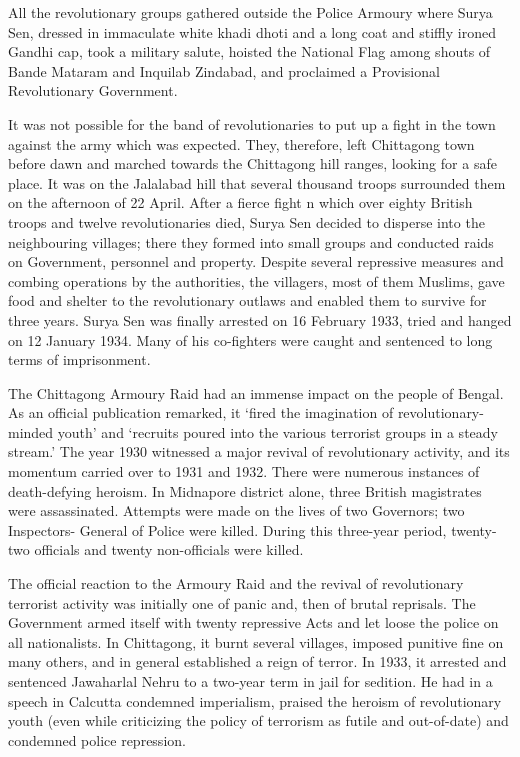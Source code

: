 All the revolutionary groups gathered outside the Police Armoury where Surya Sen, dressed in immaculate white khadi dhoti and a long coat and stiffly ironed Gandhi cap, took a military salute, hoisted the National Flag among shouts of Bande Mataram and Inquilab Zindabad, and proclaimed a Provisional Revolutionary Government.

It was not possible for the band of revolutionaries to put up a fight in the town against the army which was expected. They, therefore, left Chittagong town before dawn and marched towards the Chittagong hill ranges, looking for a safe place. It was on the Jalalabad hill that several thousand troops surrounded them on the afternoon of 22 April. After a fierce fight n which over eighty British troops and twelve revolutionaries died, Surya Sen decided to disperse into the neighbouring villages; there they formed into small groups and conducted raids on Government, personnel and property. Despite several repressive measures and combing operations by the authorities, the villagers, most of them Muslims, gave food and shelter to the revolutionary outlaws and enabled them to survive for three years. Surya Sen was finally arrested on 16 February 1933, tried and hanged on 12 January 1934. Many of his co-fighters were caught and sentenced to long terms of imprisonment.

The Chittagong Armoury Raid had an immense impact on the people of Bengal. As an official publication remarked, it `fired the imagination of revolutionary-minded youth' and `recruits poured into the various terrorist groups in a steady stream.' The year 1930 witnessed a major revival of revolutionary activity, and its momentum carried over to 1931 and 1932. There were numerous instances of death-defying heroism. In Midnapore district alone, three British magistrates were assassinated. Attempts were made on the lives of two Governors; two Inspectors- General of Police were killed. During this three-year period, twenty-two officials and twenty non-officials were killed.

The official reaction to the Armoury Raid and the revival of revolutionary terrorist activity was initially one of panic and, then of brutal reprisals. The Government armed itself with twenty repressive Acts and let loose the police on all nationalists. In Chittagong, it burnt several villages, imposed punitive fine on many others, and in general established a reign of terror. In 1933, it arrested and sentenced Jawaharlal Nehru to a two-year term in jail for sedition. He had in a speech in Calcutta condemned imperialism, praised the heroism of revolutionary youth (even while criticizing the policy of terrorism as futile and out-of-date) and condemned police repression.

